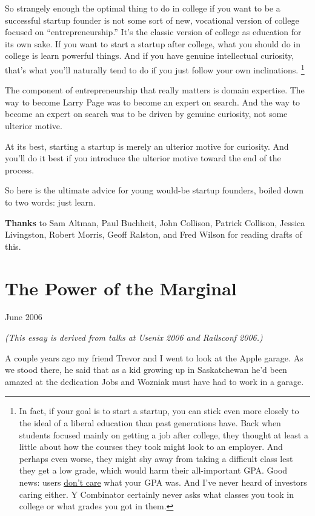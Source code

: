 \documentclass[12pt]{book}
\begin{document}
So strangely enough the optimal thing to do in college if you want to be
a successful startup founder is not some sort of new, vocational version
of college focused on ``entrepreneurship.'' It's the classic version of
college as education for its own sake. If you want to start a startup
after college, what you should do in college is learn powerful things.
And if you have genuine intellectual curiosity, that's what you'll
naturally tend to do if you just follow your own inclinations.
\footnote{In fact, if your goal is to start a startup, you can stick even
more closely to the ideal of a liberal education than past generations
have. Back when students focused mainly on getting a job after college,
they thought at least a little about how the courses they took might
look to an employer. And perhaps even worse, they might shy away from
taking a difficult class lest they get a low grade, which would harm
their all-important GPA. Good news: users \href{credentials.html}{don't
care} what your GPA was. And I've never heard of investors caring
either. Y Combinator certainly never asks what classes you took in
college or what grades you got in them.}

The component of entrepreneurship that really matters is domain
expertise. The way to become Larry Page was to become an expert on
search. And the way to become an expert on search was to be driven by
genuine curiosity, not some ulterior motive.

At its best, starting a startup is merely an ulterior motive for
curiosity. And you'll do it best if you introduce the ulterior motive
toward the end of the process.

So here is the ultimate advice for young would-be startup founders,
boiled down to two words: just learn.


\textbf{Thanks} to Sam Altman, Paul Buchheit, John Collison, Patrick
Collison, Jessica Livingston, Robert Morris, Geoff Ralston, and Fred
Wilson for reading drafts of this.
\chapter{The Power of the Marginal}

June 2006

\emph{(This essay is derived from talks at Usenix 2006 and Railsconf
2006.)}

A couple years ago my friend Trevor and I went to look at the Apple
garage. As we stood there, he said that as a kid growing up in
Saskatchewan he'd been amazed at the dedication Jobs and Wozniak must
have had to work in a garage.
\end{document}
